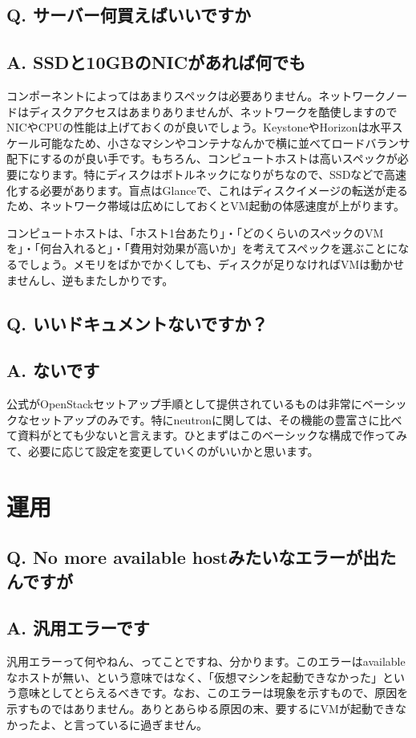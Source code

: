 \documentclass[9pt,b5paper,tombo,openany]{jsbook}
\begin{document}
\subsection*{{\bfseries Q.} サーバー何買えばいいですか}
\subsection*{{\bfseries A.} SSDと10GBのNICがあれば何でも}
コンポーネントによってはあまりスペックは必要ありません。ネットワークノードはディスクアクセスはあまりありませんが、ネットワークを酷使しますのでNICやCPUの性能は上げておくのが良いでしょう。KeystoneやHorizonは水平スケール可能なため、小さなマシンやコンテナなんかで横に並べてロードバランサ配下にするのが良い手です。もちろん、コンピュートホストは高いスペックが必要になります。特にディスクはボトルネックになりがちなので、SSDなどで高速化する必要があります。盲点はGlanceで、これはディスクイメージの転送が走るため、ネットワーク帯域は広めにしておくとVM起動の体感速度が上がります。

コンピュートホストは、「ホスト1台あたり」・「どのくらいのスペックのVMを」・「何台入れると」・「費用対効果が高いか」を考えてスペックを選ぶことになるでしょう。メモリをばかでかくしても、ディスクが足りなければVMは動かせませんし、逆もまたしかりです。

\subsection*{{\bfseries Q.} いいドキュメントないですか？}
\subsection*{{\bfseries A.} ないです}
公式がOpenStackセットアップ手順として提供されているものは非常にベーシックなセットアップのみです。特にneutronに関しては、その機能の豊富さに比べて資料がとても少ないと言えます。ひとまずはこのベーシックな構成で作ってみて、必要に応じて設定を変更していくのがいいかと思います。

\section{運用}

\subsection*{{\bfseries Q.} No more available hostみたいなエラーが出たんですが}
\subsection*{{\bfseries A.} 汎用エラーです}
汎用エラーって何やねん、ってことですね、分かります。このエラーはavailableなホストが無い、という意味ではなく、「仮想マシンを起動できなかった」という意味としてとらえるべきです。なお、このエラーは現象を示すもので、原因を示すものではありません。ありとあらゆる原因の末、要するにVMが起動できなかったよ、と言っているに過ぎません。
\end{document}
